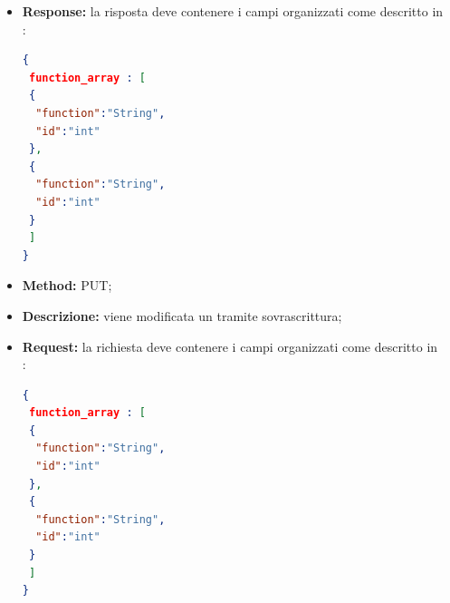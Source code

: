 \begin{itemize}
\begin{itemize}
\item \textbf{Response:} la risposta deve contenere i campi organizzati come descritto in \\:
\begin{lstlisting}[language=json,firstnumber=1]
{
 function_array : [
 {
  "function":"String",
  "id":"int"
 },
 {
  "function":"String",
  "id":"int"
 }
 ]
}
\end{lstlisting}
\end{itemize}

\begin{itemize}
\item \textbf{Method:} PUT;
\item \textbf{Descrizione:} viene modificata un  tramite sovrascrittura;
\item \textbf{Request:} la richiesta deve contenere i campi organizzati come descritto in \\:
\begin{lstlisting}[language=json,firstnumber=1]
{
 function_array : [
 {
  "function":"String",
  "id":"int"
 },
 {
  "function":"String",
  "id":"int"
 }
 ]
}
\end{lstlisting}

\end{itemize}

\end{itemize}




